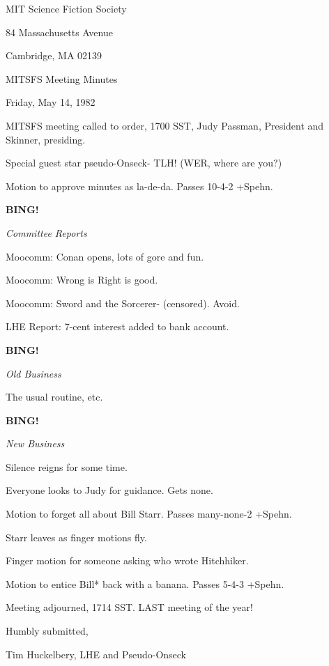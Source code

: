 \documentclass[12pt]{article}
\newcommand{\bing}{{\bf BING!} }
\newcommand{\goto}[1]{\bing \vskip 12pt \centerline{{\em{#1}}}}
\begin{document}
\begin{center}

MIT Science Fiction Society 

84 Massachusetts Avenue

Cambridge, MA 02139

\vspace{12pt}

MITSFS Meeting Minutes 

Friday, May 14, 1982

\end{center}
 
\vspace{18pt}

\setlength{\parskip}{6pt}

\noindent
MITSFS meeting called to order, 1700 SST,
Judy Passman, President and Skinner, presiding.

Special guest star pseudo-Onseck- TLH! (WER, where are you?)

Motion to approve minutes as la-de-da. Passes 10-4-2 +Spehn.

\goto{Committee Reports}

Moocomm: Conan opens, lots of gore and fun.

Moocomm: Wrong is Right is good.

Moocomm: Sword and the Sorcerer- (censored). Avoid.

LHE Report: 7-cent interest added to bank account.

\goto{Old Business}

The usual routine, etc.

\goto{New Business}

Silence reigns for some time.

Everyone looks to Judy for guidance. Gets none.

Motion to forget all about Bill Starr. Passes many-none-2 +Spehn.

Starr leaves as finger motions fly.

Finger motion for someone asking who wrote Hitchhiker.

Motion to entice Bill* back with a banana. Passes 5-4-3 +Spehn.

\vspace{12pt}

\noindent
Meeting adjourned, 1714 SST. LAST meeting of the year!

\vspace{18pt}

\centerline{Humbly submitted,}
\centerline{Tim Huckelbery, LHE and Pseudo-Onseck}
\end{document}
